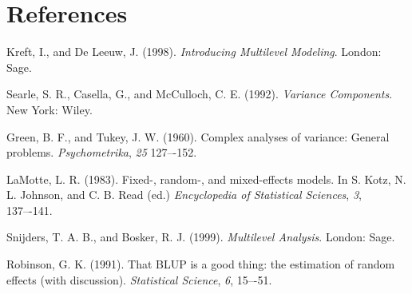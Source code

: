 \documentclass[stu,11pt]{apa7}
\begin{document}
\section{References}

\hangindent=0.5in Kreft, I., and De Leeuw, J. (1998). \textit{Introducing Multilevel Modeling}. London: Sage.

Searle, S. R., Casella, G., and McCulloch, C. E. (1992). \textit{Variance Components}. New York: Wiley.

Green, B. F., and Tukey, J. W. (1960). Complex analyses of variance: General problems. \textit{Psychometrika}, \textit{25} 127–-152.

LaMotte, L. R. (1983). Fixed-, random-, and mixed-effects models. In S. Kotz, N. L. Johnson, and C. B. Read (ed.) \textit{Encyclopedia of Statistical Sciences}, \textit{3}, 137–-141.

Snijders, T. A. B., and Bosker, R. J. (1999). \textit{Multilevel Analysis}. London: Sage.

Robinson, G. K. (1991). That BLUP is a good thing: the estimation
of random effects (with discussion). \textit{Statistical Science}, \textit{6}, 15–-51.
\end{document}
